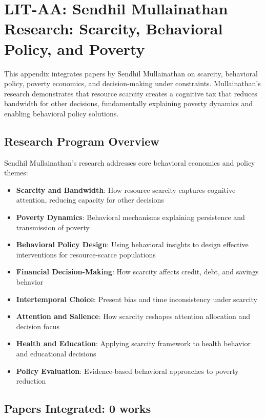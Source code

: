 
\section{LIT-AA: Sendhil Mullainathan Research: Scarcity, Behavioral Policy, and Poverty}
\label{app:litaa}

This appendix integrates papers by Sendhil Mullainathan on scarcity, behavioral policy, poverty economics, and decision-making under constraints. Mullainathan's research demonstrates that resource scarcity creates a cognitive tax that reduces bandwidth for other decisions, fundamentally explaining poverty dynamics and enabling behavioral policy solutions.

\subsection{Research Program Overview}

Sendhil Mullainathan's research addresses core behavioral economics and policy themes:

\begin{itemize}
  \item \textbf{Scarcity and Bandwidth}: How resource scarcity captures cognitive attention, reducing capacity for other decisions
  \item \textbf{Poverty Dynamics}: Behavioral mechanisms explaining persistence and transmission of poverty
  \item \textbf{Behavioral Policy Design}: Using behavioral insights to design effective interventions for resource-scarce populations
  \item \textbf{Financial Decision-Making}: How scarcity affects credit, debt, and savings behavior
  \item \textbf{Intertemporal Choice}: Present bias and time inconsistency under scarcity
  \item \textbf{Attention and Salience}: How scarcity reshapes attention allocation and decision focus
  \item \textbf{Health and Education}: Applying scarcity framework to health behavior and educational decisions
  \item \textbf{Policy Evaluation}: Evidence-based behavioral approaches to poverty reduction
\end{itemize}

\subsection{Papers Integrated: 0 works}


